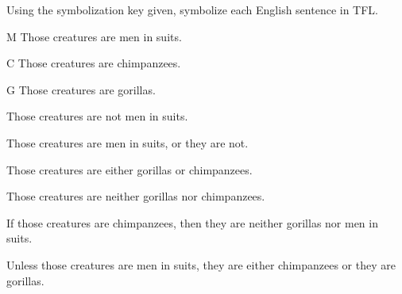 \practiceproblems
\problempart Using the symbolization key given, symbolize each English sentence in TFL.\label{pr.monkeysuits}
	\begin{ekey}
		\item[M] Those creatures are men in suits. 
		\item[C] Those creatures are chimpanzees. 
		\item[G] Those creatures are gorillas.
	\end{ekey}
\begin{earg}
\item Those creatures are not men in suits.
\item Those creatures are men in suits, or they are not.
\item Those creatures are either gorillas or chimpanzees.
\item Those creatures are neither gorillas nor chimpanzees.
\item If those creatures are chimpanzees, then they are neither gorillas nor men in suits.
\item Unless those creatures are men in suits, they are either chimpanzees or they are gorillas.
\end{earg}

